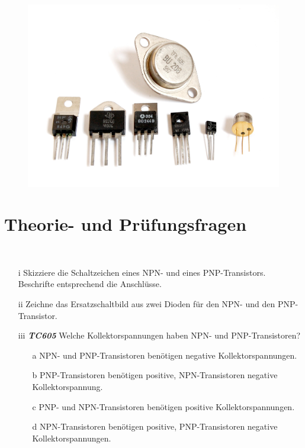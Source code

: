 

\begin{figure}
 \vspace{-6cm}
  \includegraphics[scale=0.4]{Transistor/Bilder/Transistors-white.jpg}
 \vspace{-6cm}
\end{figure}

\section{Theorie- und Prüfungsfragen}

~~~~~~

\begin{enumerate}
\itemsep1pt\parskip0pt
\item[i] Skizziere die Schaltzeichen eines NPN- und eines PNP-Transistors. Beschrifte  entsprechend die Anschlüsse.
\item[ii] Zeichne das Ersatzschaltbild aus zwei Dioden für den NPN- und den PNP-Transistor.
\end{enumerate}

\begin{enumerate} 
\item[iii] \emph{\textbf{TC605}} Welche Kollektorspannungen haben NPN- und PNP-Transistoren?
	\begin{enumerate}
	\itemsep1pt\parskip0pt
		\item[a] NPN- und PNP-Transistoren benötigen negative Kollektorspannungen.
		\item[b] PNP-Transistoren benötigen positive, NPN-Transistoren negative Kollektorspannung.
		\item[c] PNP- und NPN-Transistoren benötigen positive Kollektorspannungen.
		\item[d] NPN-Transistoren benötigen positive, PNP-Transistoren negative Kollektorspannungen.
	\end{enumerate}
\end{enumerate}

